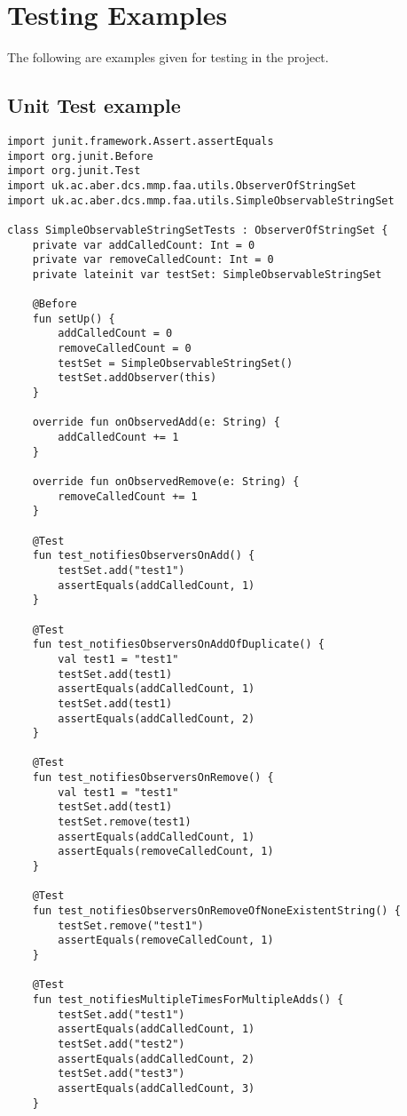 \section{Testing Examples} 
The following are examples given for testing in the project.

\subsection{Unit Test example} \label{Unit Test Example}
\begin{verbatim}
import junit.framework.Assert.assertEquals
import org.junit.Before
import org.junit.Test
import uk.ac.aber.dcs.mmp.faa.utils.ObserverOfStringSet
import uk.ac.aber.dcs.mmp.faa.utils.SimpleObservableStringSet

class SimpleObservableStringSetTests : ObserverOfStringSet {
    private var addCalledCount: Int = 0
    private var removeCalledCount: Int = 0
    private lateinit var testSet: SimpleObservableStringSet

    @Before
    fun setUp() {
        addCalledCount = 0
        removeCalledCount = 0
        testSet = SimpleObservableStringSet()
        testSet.addObserver(this)
    }

    override fun onObservedAdd(e: String) {
        addCalledCount += 1
    }

    override fun onObservedRemove(e: String) {
        removeCalledCount += 1
    }

    @Test
    fun test_notifiesObserversOnAdd() {
        testSet.add("test1")
        assertEquals(addCalledCount, 1)
    }

    @Test
    fun test_notifiesObserversOnAddOfDuplicate() {
        val test1 = "test1"
        testSet.add(test1)
        assertEquals(addCalledCount, 1)
        testSet.add(test1)
        assertEquals(addCalledCount, 2)
    }

    @Test
    fun test_notifiesObserversOnRemove() {
        val test1 = "test1"
        testSet.add(test1)
        testSet.remove(test1)
        assertEquals(addCalledCount, 1)
        assertEquals(removeCalledCount, 1)
    }

    @Test
    fun test_notifiesObserversOnRemoveOfNoneExistentString() {
        testSet.remove("test1")
        assertEquals(removeCalledCount, 1)
    }

    @Test
    fun test_notifiesMultipleTimesForMultipleAdds() {
        testSet.add("test1")
        assertEquals(addCalledCount, 1)
        testSet.add("test2")
        assertEquals(addCalledCount, 2)
        testSet.add("test3")
        assertEquals(addCalledCount, 3)
    }


\end{verbatim}
